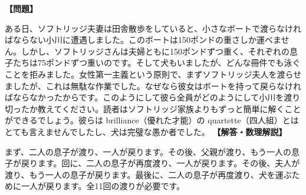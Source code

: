 \documentclass[10pt,a4paper,oneside,openany]{ltjsbook}
\begin{document}
\begin{tcolorbox}[colback=softblue,colframe=primaryblue,title=\textbf{第 373 問：川を渡る （原題: CROSSING THE STREAM.）},arc=2mm,boxrule=1pt,breakable]
\textbf{【問題】}\par\vspace{0.3em}
ある日、ソフトリッジ夫妻は田舎散歩をしていると、小さなボートで渡らなければならない小川に遭遇しました。このボートは150ポンドの重さしか運べません。しかし、ソフトリッジさんは夫婦ともに150ポンドずつ重く、それぞれの息子たちは75ポンドずつ重いのです。そして犬もいましたが、どんな冊件でも泳ぐことを拒みました。女性第一主義という原則で、まずソフトリッジ夫人を渡らせましたが、これは無駄な作業でした。なぜなら彼女はボートを持って戻らなければならなかったからです。このようにして彼ら全員がどのようにして小川を渡り切ったか教えてください。読者はソフトリッジ家族よりもずっと簡単に解くことができるでしょう。彼らは brilliance（優れた才能）の quartette（四人組）とはとても言えませんでしたし、犬は完璧な愚か者でした。
\tcblower
\textbf{【解答・数理解説】}\par\vspace{0.3em}
まず、二人の息子が渡り、一人が戻ります。その後、父親が渡り、もう一人の息子が戻ります。回に、二人の息子が再度渡り、一人が戻ります。その後、夫人が渡り、もう一人の息子が戻ります。最後に、二人の息子が再度渡り、犬を運ぶために一人が戻ります。全11回の渡りが必要です。
\end{tcolorbox}
\end{document}
